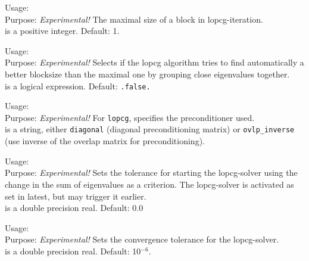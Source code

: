 {
  \noindent
  Usage:   \\[1.0ex]
  Purpose: \emph{Experimental!} The maximal size of a block in lopcg-iteration.
    \\[1.0ex]
   is a positive integer. Default: 1. \\
}

{
  \noindent
  Usage:   \\[1.0ex]
  Purpose: \emph{Experimental!} Selects if the lopcg algorithm tries to find
    automatically a better blocksize than the maximal one by grouping close
    eigenvalues together. \\[1.0ex]
   is a logical expression. Default: \texttt{.false.} \\
}

{
  \noindent
  Usage:   \\[1.0ex]
  Purpose: \emph{Experimental!} For  \texttt{lopcg},
    specifies the preconditioner used. \\[1.0ex]
   is a string, either \texttt{diagonal} (diagonal preconditioning
    matrix) or \texttt{ovlp\_inverse} (use inverse of the overlap matrix for
    preconditioning). \\
}

{
  \noindent
  Usage:   \\[1.0ex]
  Purpose: \emph{Experimental!} Sets the tolerance for starting the lopcg-solver
    using the change in the sum of eigenvalues as a criterion. The lopcg-solver
    is activated as set in  latest, but
     may trigger it earlier. \\[1.0ex]
   is a double precision real. Default: 0.0 \\
}

{
  \noindent
  Usage:   \\[1.0ex]
  Purpose: \emph{Experimental!} Sets the convergence tolerance for the
    lopcg-solver.\\[1.0ex]
   is a double precision real. Default: 10$^{-6}$. \\
}

